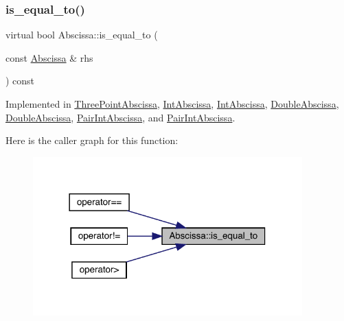 \mbox{\label{classAbscissa_a4adf4055c1eee010f9493e0ebb66348a}} 
\subsubsection{\texorpdfstring{is\_equal\_to()}{is\_equal\_to()}\hspace{0.1cm}{\footnotesize\ttfamily [2/2]}}
{\footnotesize\ttfamily virtual bool Abscissa\+::is\+\_\+equal\+\_\+to (\begin{DoxyParamCaption}\item[{const \mbox{\hyperlink{classAbscissa}{Abscissa}} \&}]{rhs }\end{DoxyParamCaption}) const\hspace{0.3cm}{\ttfamily [pure virtual]}}



Implemented in \mbox{\hyperlink{classThreePointAbscissa_a91dd5c897c1b2b1fe271597fdc0d5c3d}{Three\+Point\+Abscissa}}, \mbox{\hyperlink{classIntAbscissa_a4d7663a45e6882b5d57dd59262d3900b}{Int\+Abscissa}}, \mbox{\hyperlink{classIntAbscissa_a4d7663a45e6882b5d57dd59262d3900b}{Int\+Abscissa}}, \mbox{\hyperlink{classDoubleAbscissa_ac62533c5fa000e272ad818c0afe7f02b}{Double\+Abscissa}}, \mbox{\hyperlink{classDoubleAbscissa_ac62533c5fa000e272ad818c0afe7f02b}{Double\+Abscissa}}, \mbox{\hyperlink{classPairIntAbscissa_a9f4bf45aafd0efa0a47fa6e8b77e25fa}{Pair\+Int\+Abscissa}}, and \mbox{\hyperlink{classPairIntAbscissa_a9f4bf45aafd0efa0a47fa6e8b77e25fa}{Pair\+Int\+Abscissa}}.

Here is the caller graph for this function\+:
\nopagebreak
\begin{figure}[H]
\begin{center}
\leavevmode
\includegraphics[width=294pt]{dd/db2/classAbscissa_a4adf4055c1eee010f9493e0ebb66348a_icgraph}
\end{center}
\end{figure}
\mbox{\label{classAbscissa_a399c2f7a1309368b477c767ff5f63927}} 
